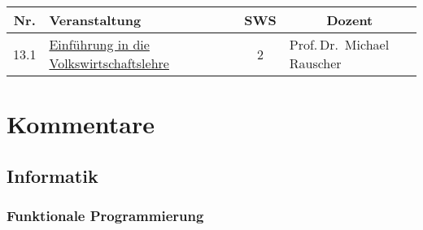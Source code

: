 \documentclass[%
a4paper, %
11pt,               %
leqno,              %
fleqn,              %
]
{scrartcl}
\begin{document}
\begin{tabularx}{\textwidth}{cXcp{5.6cm}}
  \textbf{Nr.} & \textbf{Veranstaltung} & \textbf{SWS} &
  \multicolumn{1}{c}{\textbf{Dozent}}\\
  \hline
  13.1 & \hyperref[ssub:Einführung in die Volkswirtschaftslehre]{Einführung in
  die Volkswirtschaftslehre} & 2 & Prof.\,Dr. Michael Rauscher\\
\end{tabularx}



\newpage

\section{Kommentare} %
\label{sec:Kommentare}

\subsection{Informatik} %
\label{sub:Informatik}

\subsubsection{Funktionale Programmierung} %
\label{ssub:Funktionale Programmierung}

\end{document}
